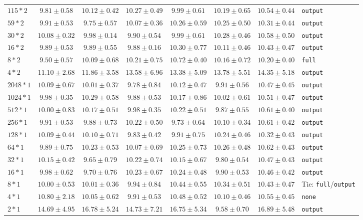 \documentclass[conference]{IEEEtran}
\begin{document}
\begin{longtable}{@{}lccccccl@{}}
$115*2$ & $9.81 \pm 0.58$ & $10.12 \pm 0.42$ & $10.27 \pm 0.49$ & $9.99 \pm 0.61$ & $10.19 \pm 0.65$ & \bfseries $10.54 \pm 0.44$ & \texttt{output} \\
$59*2$ & $9.91 \pm 0.53$ & $9.75 \pm 0.57$ & $10.07 \pm 0.36$ & $10.26 \pm 0.59$ & $10.25 \pm 0.50$ & \bfseries $10.31 \pm 0.44$ & \texttt{output} \\
$30*2$ & $10.08 \pm 0.32$ & $9.98 \pm 0.14$ & $9.90 \pm 0.54$ & $9.99 \pm 0.61$ & $10.28 \pm 0.46$ & \bfseries $10.58 \pm 0.50$ & \texttt{output} \\
$16*2$ & $9.89 \pm 0.53$ & $9.89 \pm 0.55$ & $9.88 \pm 0.16$ & $10.30 \pm 0.77$ & $10.11 \pm 0.46$ & \bfseries $10.43 \pm 0.47$ & \texttt{output} \\
$8*2$ & $9.50 \pm 0.57$ & $10.09 \pm 0.68$ & $10.21 \pm 0.75$ & \bfseries $10.72 \pm 0.40$ & $10.16 \pm 0.72$ & $10.20 \pm 0.40$ & \texttt{full} \\
$4*2$ & $11.10 \pm 2.68$ & $11.86 \pm 3.58$ & $13.58 \pm 6.96$ & $13.38 \pm 5.09$ & $13.78 \pm 5.51$ & \bfseries $14.35 \pm 5.18$ & \texttt{output} \\
$2048*1$ & $10.09 \pm 0.67$ & $10.01 \pm 0.37$ & $9.78 \pm 0.84$ & $10.12 \pm 0.47$ & $9.91 \pm 0.56$ & \bfseries $10.47 \pm 0.45$ & \texttt{output} \\
$1024*1$ & $9.98 \pm 0.35$ & $10.29 \pm 0.58$ & $9.88 \pm 0.53$ & $10.17 \pm 0.86$ & $10.02 \pm 0.61$ & \bfseries $10.51 \pm 0.47$ & \texttt{output} \\
$512*1$ & $10.00 \pm 0.83$ & $10.17 \pm 0.51$ & $9.98 \pm 0.35$ & $10.22 \pm 0.51$ & $9.87 \pm 0.55$ & \bfseries $10.61 \pm 0.40$ & \texttt{output} \\
$256*1$ & $9.91 \pm 0.53$ & $9.88 \pm 0.73$ & $10.22 \pm 0.50$ & $9.73 \pm 0.64$ & $10.10 \pm 0.34$ & \bfseries $10.61 \pm 0.42$ & \texttt{output} \\
$128*1$ & $10.09 \pm 0.44$ & $10.10 \pm 0.71$ & $9.83 \pm 0.42$ & $9.91 \pm 0.75$ & $10.24 \pm 0.46$ & \bfseries $10.32 \pm 0.43$ & \texttt{output} \\
$64*1$ & $9.89 \pm 0.75$ & $10.23 \pm 0.53$ & $10.07 \pm 0.69$ & $10.25 \pm 0.73$ & $10.26 \pm 0.48$ & \bfseries $10.62 \pm 0.43$ & \texttt{output} \\
$32*1$ & $10.15 \pm 0.42$ & $9.65 \pm 0.79$ & $10.22 \pm 0.74$ & $10.15 \pm 0.67$ & $9.80 \pm 0.54$ & \bfseries $10.47 \pm 0.43$ & \texttt{output} \\
$16*1$ & $9.98 \pm 0.62$ & $9.70 \pm 0.76$ & $10.23 \pm 0.67$ & $10.24 \pm 0.48$ & $9.90 \pm 0.53$ & \bfseries $10.46 \pm 0.42$ & \texttt{output} \\
$8*1$ & $10.00 \pm 0.53$ & $10.01 \pm 0.36$ & $9.94 \pm 0.84$ & \bfseries $10.44 \pm 0.55$ & $10.34 \pm 0.51$ & \bfseries $10.43 \pm 0.47$ & Tie: \texttt{full}/\texttt{output} \\
$4*1$ & \bfseries $10.80 \pm 2.18$ & $10.05 \pm 0.62$ & $9.91 \pm 0.53$ & $10.48 \pm 0.52$ & $10.10 \pm 0.46$ & $10.55 \pm 0.45$ & \texttt{none} \\
$2*1$ & $14.69 \pm 4.95$ & $16.78 \pm 5.24$ & $14.73 \pm 7.21$ & $16.75 \pm 5.34$ & $9.58 \pm 0.70$ & \bfseries $16.89 \pm 5.48$ & \texttt{output} \\

\end{longtable}
\end{document}
